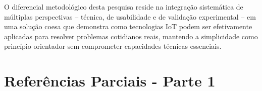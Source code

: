 \documentclass[twoside,english,brazilian]{UNISINOSmonografia}
\begin{document}
O diferencial metodológico desta pesquisa reside na integração sistemática de múltiplas perspectivas – técnica, de usabilidade e de validação experimental – em uma solução coesa que demonstra como tecnologias IoT podem ser efetivamente aplicadas para resolver problemas cotidianos reais, mantendo a simplicidade como princípio orientador sem comprometer capacidades técnicas essenciais.

\chapter*{Referências Parciais - Parte 1}
\end{document}
